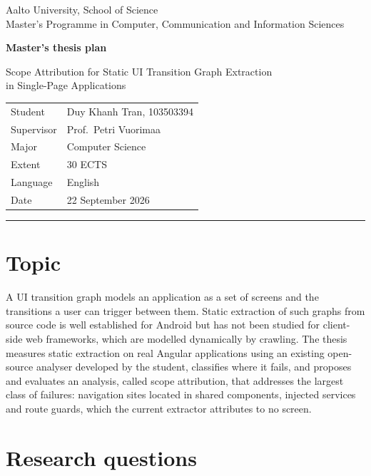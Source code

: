 \documentclass[11pt,a4paper]{article}
\begin{document}
{\sffamily
{\small Aalto University, School of Science\\
Master's Programme in Computer, Communication and Information Sciences}\par\vspace{1.1em}
{\Large\bfseries Master's thesis plan}\par\vspace{0.5em}
{\large Scope Attribution for Static UI Transition Graph Extraction\\ in Single-Page Applications}\par\vspace{0.8em}
\begin{tabular}{@{}ll}
Student & Duy Khanh Tran, 103503394 \\
Supervisor & Prof.\ Petri Vuorimaa \\
Major & Computer Science \\
Extent & 30 ECTS \\
Language & English \\
Date & 22 September 2026 \\
\end{tabular}
}
\par\vspace{0.4em}\hrule\vspace{0.7em}

\section{Topic}

A UI transition graph models an application as a set of screens and the transitions
a user can trigger between them. Static extraction of such graphs from source code is
well established for Android but has not been studied for client-side web frameworks,
which are modelled dynamically by crawling. The thesis measures static extraction on
real Angular applications using an existing open-source analyser developed by the
student, classifies where it fails, and proposes and evaluates an analysis, called
scope attribution, that addresses the largest class of failures: navigation sites
located in shared components, injected services and route guards, which the current
extractor attributes to no screen.

\section{Research questions}
\end{document}
